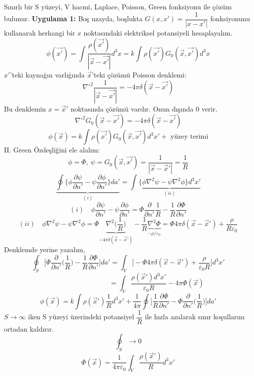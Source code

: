 \begin{theorem}
    Sınırlı bir S yüzeyi, V hacmi, Laplace, Poisson, Green fonksiyonu ile çözüm bulunur.
\textbf{Uygulama 1:}
        Boş uzayda, boşlukta $G(x,x') = \dfrac{1}{|x-x'|}$ fonksiyonunu kullanarak herhangi bir $x$ noktasındaki elektriksel potansiyeli hesaplayalım.
\[ \phi(\Vec{x'}) = \int \dfrac{\rho (\Vec{x'})}{|\Vec{x} - \Vec{x'}|} d^{3}x = k \int \rho (\Vec{x'}) G_{0} (\Vec{x},\Vec{x'}) d^{3}x \]
$x'$'teki kaynağın varlığında $\Vec{x}$'teki çözümü Poisson denklemi:
\[ \nabla'^{2}  \dfrac{1}{|\Vec{x} - \Vec{x'}|} = -4 \pi \delta (\Vec{x}-\Vec{x'}) \]
Bu denklemin $x=\Vec{x}'$ noktasında çözümü vardır. Onun dışında 0 verir.
\[ \nabla'^{2}   G_{0} (\Vec{x} - \Vec{x'}) = -4 \pi \delta (\Vec{x}-\Vec{x'}) \tag{1.39} \]
\[ \phi ( \Vec{x}) = k \int \rho (\Vec{x'}) G_{0} (\Vec{x},\Vec{x'}) d^{3}x' + \textrm{ yüzey terimi}  \]
II. Green Özdeşliğini ele alalım:
\[ \phi = \Phi,\  \psi = G_{0} (\Vec{x},\Vec{x'}) = \dfrac{1}{|\Vec{x} - \Vec{x}'|} = \dfrac{1}{R} \]
\[ \underbrace{\oint \Bigg\{ \phi \dfrac{\partial \psi}{\partial n'} - \psi \dfrac{\partial \phi}{\partial n'} \Bigg\} da'}_{(i)} = \int \underbrace{\Bigg\{ \phi \nabla^{2} \psi - \psi \nabla^{2} \phi  \Bigg\} d^{3}x'}_{(ii)} \]
\[  (i) \quad \phi \dfrac{\partial \psi}{\partial n'} - \psi \dfrac{\partial \phi}{\partial n'} = \Phi \dfrac{\partial}{\partial n'} \dfrac{1}{R} - \dfrac{1}{R} \dfrac{\partial \Phi}{\partial n'} \]
\[ (ii) \quad \phi \nabla^{2} \psi - \psi \nabla^{2} \phi = \Phi \underbrace{\nabla^{2} \bigg(\dfrac{1}{R} \bigg)}_{ - 4 \pi \delta (\Vec{x} - \Vec{x}')  } - \dfrac{1}{R} \underbrace{\nabla^{2} \Phi}_{-\rho/\varepsilon_{0}} = \Phi 4 \pi \delta (\Vec{x} - \Vec{x}') + \dfrac{\rho}{R \varepsilon_{0}}\]
Denklemde yerine yazalım,
\[ \oint_{S} \Bigg[ \Phi \dfrac{\partial}{\partial n'} \bigg(\dfrac{1}{R} \bigg) - \dfrac{1}{R}  \dfrac{\partial \Phi}{\partial n'} \Bigg] da' = \int_{V}  \Bigg[ - \Phi 4 \pi \delta (\Vec{x} - \Vec{x}') + \dfrac{\rho}{\varepsilon_{0} R} \Bigg]  d^{3}x'\]
\[ \qquad \qquad \qquad \ \qquad = \int_{V} \dfrac{\rho (\Vec{x}') d^{3}x'}{\varepsilon_{0} R} - 4 \pi \Phi (\Vec{x})\]
\[ \phi (\Vec{x}) = k \int \rho (\Vec{x}') \dfrac{1}{R} d^{3}x' + \dfrac{1}{4 \pi} \oint \Bigg[ \dfrac{1}{R}  \dfrac{\partial \Phi}{\partial n'} - \Phi \dfrac{\partial}{\partial n'} \bigg(\dfrac{1}{R} \bigg) \Bigg] da'  \tag{1.36}\]
$S \rightarrow \infty$ iken S yüzeyi üzerindeki potansiyel $\dfrac{1}{R}$ ile hızla azalarak sınır koşullarını ortadan kaldırır.
\[ \oint_{S} \rightarrow 0\]
\[ \Phi (\Vec{x}) = \dfrac{1}{4 \pi \varepsilon_{0}} \int_{V} \dfrac{\rho (\Vec{x}')}{R} d^{3}x'\]

\end{theorem}
